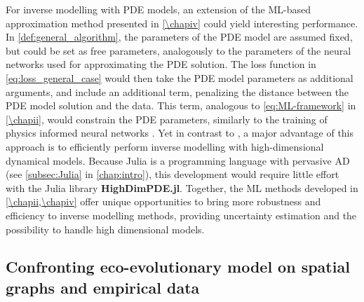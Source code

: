 For inverse modelling with PDE models, an extension of the ML-based approximation method presented in \cref{\chapiv} could yield interesting performance.
% 
In \cref{def:general_algorithm}, the parameters of the PDE model are assumed fixed, but could be set as free parameters, analogously to the parameters of the neural networks used for approximating the PDE solution. The loss function in \cref{eq:loss_general_case} would then take the PDE model parameters as additional arguments, and include an additional term, penalizing the distance between the PDE model solution and the data. This term, analogous to \cref{eq:ML-framework} in \cref{\chapii}, would constrain the PDE parameters, similarly to the training of physics informed neural networks \citep{Raissi2019,Yazdani2020}.
% 
Yet in contrast to \cite{Raissi2019,Yazdani2020}, a major advantage of this approach is to efficiently perform inverse modelling with high-dimensional dynamical models. Because Julia is a programming language with pervasive AD (see \cref{subsec:Julia} in \cref{chap:intro}), this development would require little effort with the Julia library \textbf{HighDimPDE.jl}.
% 
Together, the ML methods developed in \cref{\chapii,\chapiv} offer unique opportunities to bring more robustness and efficiency to inverse modelling methods, providing uncertainty estimation and the possibility to handle high dimensional models.


\subsection{Confronting eco-evolutionary model on spatial graphs and empirical data}

